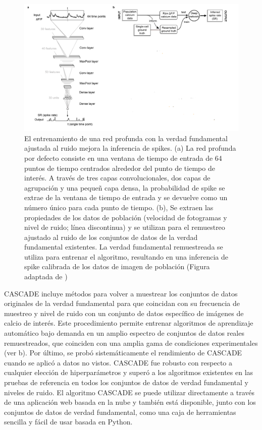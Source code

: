 \begin{figure}[h!]
	\centering\includegraphics[width=\imsize]{cascade.png}
	\caption[El entrenamiento de una red profunda con la verdad fundamental ajustada al ruido mejora la inferencia de spikes.]{El entrenamiento de una red profunda con la verdad fundamental ajustada al ruido mejora la inferencia de spikes. (a) La red profunda por defecto consiste en una ventana de tiempo de entrada de 64 puntos de tiempo centrados alrededor del punto de tiempo de interés. A través de tres capas convolucionales, dos capas de agrupación y una pequeñ capa densa, la probabilidad de spike se extrae de la ventana de tiempo de entrada y se devuelve como un número único para cada punto de tiempo. (b), Se extraen las propiedades de los datos de población (velocidad de fotogramas y nivel de ruido; línea discontinua) y se utilizan para el remuestreo ajustado al ruido de los conjuntos de datos de la verdad fundamental existentes. La verdad fundamental remuestreada se utiliza para entrenar el algoritmo, resultando en una inferencia de spike calibrada de los datos de imagen de población (Figura adaptada de \protect\cite{rupprecht_database_2021})}\label{fig:cascade}
\end{figure}


CASCADE incluye métodos para volver a muestrear los conjuntos de datos originales de la verdad fundamental para que coincidan con su frecuencia de muestreo y nivel de ruido con un conjunto de datos específico de imágenes de calcio de interés. Este procedimiento permite entrenar algoritmos de aprendizaje automático bajo demanda en un amplio espectro de conjuntos de datos reales remuestreados, que coinciden con una amplia gama de condiciones experimentales (ver b). Por último, se probó sistemáticamente el rendimiento de CASCADE cuando se aplicó a datos no vistos. CASCADE fue robusto con respecto a cualquier elección de hiperparámetros y superó a los algoritmos existentes en las pruebas de referencia en todos los conjuntos de datos de verdad fundamental y niveles de ruido. El algoritmo CASCADE se puede utilizar directamente a través de una aplicación web basada en la nube y también está disponible, junto con los conjuntos de datos de verdad fundamental, como una caja de herramientas sencilla y fácil de usar basada en Python.

